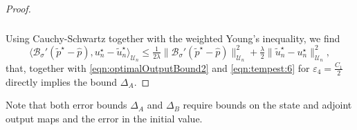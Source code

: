 \documentclass[reqno]{amsart}
\newcommand{\U}{{\mathscr U}}
\newcommand{\adState}{p}
\newcommand{\inpVar}{u}
\newcommand{\bOper}{\calB}
\newcommand{\optInpVar}[1]{\inpVar_{#1}^\star}
\newcommand{\optInpVarN}{\optInpVar{n}}
\newcommand{\switch}{\sigma}
\newcommand{\reduce}[1]{\tilde{#1}}
\newcommand{\BoundControlA}{\Delta_{A}}
\newcommand{\BoundControlB}{\Delta_{B}}
\newcommand{\adStateRed}{\reduce{\adState}}
\newcommand{\optAdStateRed}{\adStateRed^\star}
\newcommand{\optInpVarRed}[1]{\reduce{\inpVar}_{#1}^\star}
\newcommand{\optInpVarRedN}{\optInpVarRed{n}}
\newcommand{\intermediateAdStateA}{{\hat \adState}}
\newcommand{\calB}{\mathcal{B}}
\begin{document}
\begin{proof}
\begin{align}
\begin{aligned}
        \end{aligned}
    \end{align}
 Using Cauchy-Schwartz together with the weighted Young's inequality, we find
    \begin{equation*}
		\nonumber %
		\langle \bOper_{\switch}'(\optAdStateRed-\intermediateAdStateA), \optInpVarN-\optInpVarRedN \rangle_{\U_n} \leq \tfrac{1}{2\lambda} \|\bOper_{\switch}'(\optAdStateRed-\intermediateAdStateA)\|_{\U_n}^2 + \tfrac{\lambda}{2} \|\optInpVarRedN - \optInpVarN\|^2_{\U_n},
	\end{equation*}
 that, together with \eqref{eqn:optimalOutputBound2} and \eqref{eqn:tempest:6} for $\varepsilon_4=\tfrac{C_1}{2}$ directly implies  the bound $\BoundControlA$.
\end{proof}
%
Note that both error bounds $\BoundControlA$ and $\BoundControlB$ require bounds on the state and adjoint output maps and the error in the initial value.
%
\end{document}
